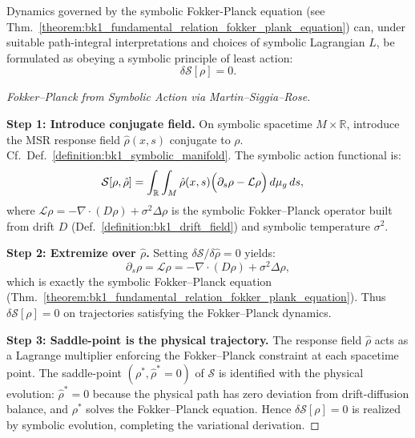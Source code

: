 \begin{theorem}
\label{theorem:bk1_princple_of_least_action}
\leavevmode\newline
Dynamics governed by the symbolic Fokker-Planck equation (see Thm.~\ref{theorem:bk1_fundamental_relation_fokker_plank_equation}) can, under suitable path-integral interpretations and choices of symbolic Lagrangian $L$, be formulated as obeying a symbolic principle of least action:
\[
\delta \mathcal{S}[\rho] = 0.
\]

\begin{proof}[Fokker--Planck from Symbolic Action via Martin--Siggia--Rose]
\label{proof:bk1_sketch_fokker_planck_action}
\leavevmode

\textbf{Step 1: Introduce conjugate field.}
On symbolic spacetime $M \times \mathbb{R}$, introduce the MSR response field
$\hat\rho(x,s)$ conjugate to $\rho$.
Cf.~Def.~\ref{definition:bk1_symbolic_manifold}.
The symbolic action functional is:
\[
\begin{aligned}
\mathcal{S}[\rho, \hat\rho]
&= \int_{\mathbb{R}} \int_M
\hat\rho(x,s)\Bigl(\partial_s \rho - \mathcal{L}\rho\Bigr)\,d\mu_g\,ds,
\end{aligned}
\]
where $\mathcal{L}\rho = -\nabla\cdot(D\rho) + \sigma^2\Delta\rho$ is the symbolic Fokker--Planck operator built from drift $D$ (Def.~\ref{definition:bk1_drift_field}) and symbolic temperature $\sigma^2$.

\textbf{Step 2: Extremize over $\hat\rho$.} Setting $\delta\mathcal{S}/\delta\hat\rho = 0$ yields:
\[
\partial_s\rho = \mathcal{L}\rho = -\nabla\cdot(D\rho) + \sigma^2\Delta\rho,
\]
which is exactly the symbolic Fokker--Planck equation (Thm.~\ref{theorem:bk1_fundamental_relation_fokker_plank_equation}). Thus $\delta\mathcal{S}[\rho] = 0$ on trajectories satisfying the Fokker--Planck dynamics.

\textbf{Step 3: Saddle-point is the physical trajectory.} The response field $\hat\rho$ acts as a Lagrange multiplier enforcing the Fokker--Planck constraint at each spacetime point. The saddle-point $(\rho^*, \hat\rho^* = 0)$ of $\mathcal{S}$ is identified with the physical evolution: $\hat\rho^* = 0$ because the physical path has zero deviation from drift-diffusion balance, and $\rho^*$ solves the Fokker--Planck equation. Hence $\delta\mathcal{S}[\rho] = 0$ is realized by symbolic evolution, completing the variational derivation.
\end{proof}
\end{theorem}

